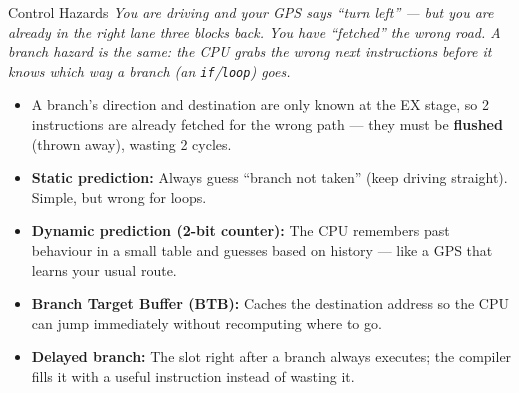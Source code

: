 \documentclass{beamer}
\begin{document}
\begin{frame}{Control Hazards}
  \textit{You are driving and your GPS says ``turn left'' --- but you are
  already in the right lane three blocks back. You have ``fetched'' the wrong
  road. A branch hazard is the same: the CPU grabs the wrong next instructions
  before it knows which way a branch (an \texttt{if}/\texttt{loop}) goes.}

  \medskip
  \begin{itemize}
    \item A branch's direction and destination are only known at the EX stage,
          so 2 instructions are already fetched for the wrong path --- they must
          be \textbf{flushed} (thrown away), wasting 2 cycles.
    \item \textbf{Static prediction:} Always guess ``branch not taken'' (keep
          driving straight). Simple, but wrong for loops.
    \item \textbf{Dynamic prediction (2-bit counter):} The CPU remembers past
          behaviour in a small table and guesses based on history --- like a GPS
          that learns your usual route.
    \item \textbf{Branch Target Buffer (BTB):} Caches the destination address
          so the CPU can jump immediately without recomputing where to go.
    \item \textbf{Delayed branch:} The slot right after a branch always executes;
          the compiler fills it with a useful instruction instead of wasting it.
  \end{itemize}
\end{frame}
\end{document}
